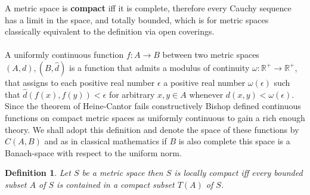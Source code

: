 \documentclass[11pt,a4paper,leqno]{report}
\newtheorem{definition}[theorem]{Definition}
\numberwithin{equation}{chapter}
\begin{document}
A metric space is \textbf{compact} iff it is complete, therefore every Cauchy sequence has a limit in the space, and totally bounded, which is for metric spaces classically equivalent to the definition via open coverings.\\
\\
A uniformly continuous function $f:A\rightarrow B$ between two metric spaces $(A,d),(B,\hat{d})$ is a function that admits a modulus of continuity $\omega:\mathbb{R}^+\rightarrow\mathbb{R}^+$, that assigns to each positive real number $\epsilon$ a positive real number $\omega(\epsilon)$ such that $\hat{d}(f(x),f(y))<\epsilon$ for arbitrary $x,y\in A$ whenever $d(x,y)<\omega(\epsilon)$. Since the theorem of Heine-Cantor fails constructively Bishop defined continuous functions on compact metric spaces as uniformly continuous to gain a rich enough theory. We shall adopt this definition and denote the space of these functions by $C(A,B)$ and as in classical mathematics if $B$ is also complete this space is a Banach-space with respect to the uniform norm.
\begin{definition} Let $S$ be a metric space then $S$ is locally compact iff every bounded subset $A$ of $S$ is contained in a compact subset $T(A)$ of $S$.\end{definition}
\end{document}
